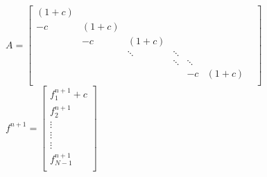 $A = 
\begin{bmatrix}
(1+c) &  \\
-c  & (1+c)  \\ 
  & -c  & (1+c)  \\ 
  &   & \ddots & \ddots &  \\
  &  &   & \ddots & \ddots & \\
   &  & &  & -c  & (1+c) & \\
\end{bmatrix}$
$ f^{n+1} = 
\begin{bmatrix}
f^{n+1}_{1}+c \\
f^{n+1}_{2} \\
\vdots \\
\vdots \\
\vdots \\
f^{n+1}_{N-1} \\
\end{bmatrix}$

